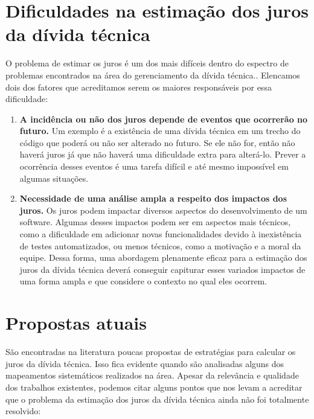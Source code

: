 \section{Dificuldades na estimação dos juros da dívida técnica}


O problema de estimar os juros é um dos mais difíceis dentro do espectro de problemas encontrados na área do gerenciamento da dívida técnica.\cite{zazworka2011investigating,power2013understanding,yli2016software,schmid2013formal}. Elencamos dois dos fatores que acreditamos serem os maiores responsáveis por essa dificuldade:

\begin{enumerate}


\item \textbf{A incidência ou não dos juros depende de eventos que ocorrerão no futuro.} Um exemplo é a existência de uma dívida técnica em um trecho do código que poderá ou não ser alterado no futuro. Se ele não for, então não haverá juros já que não haverá uma dificuldade extra para alterá-lo. Prever a ocorrência desses eventos é uma tarefa difícil e até mesmo impossível em algumas situações.

\item \textbf{Necessidade de uma análise ampla a respeito dos impactos dos juros.} Os juros podem impactar diversos aspectos do desenvolvimento de um software. Algumas desses impactos podem ser em aspectos mais técnicos, como a dificuldade em adicionar novas funcionalidades devido à inexistência de testes automatizados, ou menos técnicos, como a motivação  e a moral da equipe\cite{spinola2013investigating}.
Dessa forma, uma abordagem plenamente eficaz  para a estimação dos juros da dívida técnica deverá conseguir capiturar esses variados impactos de uma forma ampla e que considere o contexto no qual eles ocorrem.




\end{enumerate}


\section{Propostas atuais}
\label{modelos_existentes}

São encontradas na literatura poucas propostas de estratégias para calcular os juros da dívida técnica.  Isso fica evidente quando são analisadas alguns dos mapeamentos sistemáticos realizados na área\cite{ampatzoglou2015financial,li2015systematic,behutiye2017analyzing}. Apesar da relevância e qualidade dos trabalhos existentes, podemos citar alguns pontos que nos levam a acreditar que o problema da estimação dos juros da dívida técnica ainda não foi totalmente resolvido:

